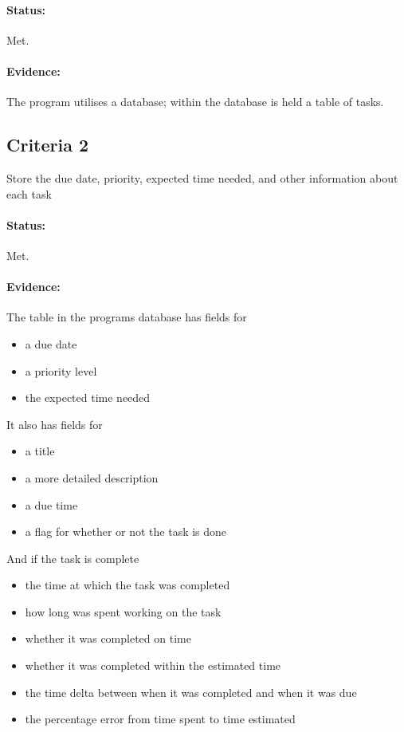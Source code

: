 \documentclass{article}
\begin{document}
\paragraph{Status:}
Met.

\paragraph{Evidence:}
The program utilises a database;
within the database is held a table of tasks.

\subsection{Criteria 2}
Store the due date, priority, expected time needed, and other information about each task

\paragraph{Status:}
Met.
\paragraph{Evidence:}
The table in the programs database has fields for
\begin{itemize}
	\item a due date
	\item a priority level
	\item the expected time needed
\end{itemize}

It also has fields for
\begin{itemize}
	\item a title
	\item a more detailed description
	\item a due time
	\item a flag for whether or not the task is done
\end{itemize}

And if the task is complete
\begin{itemize}
	\item the time at which the task was completed
	\item how long was spent working on the task
	\item whether it was completed on time
	\item whether it was completed within the estimated time
	\item the time delta between when it was completed and when it was due
  \item the percentage error from time spent to time estimated
\end{itemize}
\end{document}
